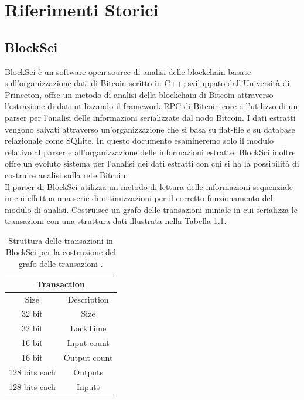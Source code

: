 \chapter{Riferimenti Storici}\label{chap:riferimentiStrotici}


\section{BlockSci} \label{sec:riferimentiStorici}

BlockSci è un software open source di analisi delle blockchain basate sull'organizzazione dati di Bitcoin scritto in C++; sviluppato dall'Università di Princeton, offre un metodo di analisi della blockchain di Bitcoin attraverso l'estrazione di dati utilizzando il framework RPC di Bitcoin-core e l'utilizzo di un parser per l'analisi delle informazioni serializzate dal nodo Bitcoin.
I dati estratti vengono salvati attraverso un'organizzazione che si basa su flat-file e su database relazionale come SQLite.
In questo documento esamineremo solo il modulo relativo al parser e all'organizzazione delle informazioni estratte; BlockSci inoltre offre un evoluto sistema per l'analisi dei dati estratti con cui si ha la possibilità di costruire analisi sulla rete Bitcoin.\\
Il parser di BlockSci utilizza un metodo di lettura delle informazioni sequenziale in cui effettua una serie di ottimizzazioni per il corretto funzionamento del modulo di analisi.
Costruisce un grafo delle transazioni miniale in cui serializza le transazioni con una struttura dati illustrata nella Tabella \ref{tab:blockSciSerialization}.

\begin{table}
       \centering\small
           \begin{tabular}{|c|c|}
               \hline
                 \multicolumn{2}{|c|}{\textbf{Transaction}} \\
                 \hline
                 \multicolumn{1}{|c|}{Size} & \multicolumn{1}{c|}{Description} \\
               \hline \hline
               32 bit & Size   \\
               \hline
               32 bit & LockTime \\
               \hline
               16 bit & Input count \\
               \hline
               16 bit & Output count \\
               \hline
               128 bits each & ﻿Outputs \\
               \hline
               128 bits each & ﻿Inputs \\
               \hline
       \end{tabular}
       \caption{Struttura delle transazioni in BlockSci per la costruzione del grafo delle transazioni \cite{blocksci:article}.\label{tab:blockSciSerialization}}
   \end{table}

